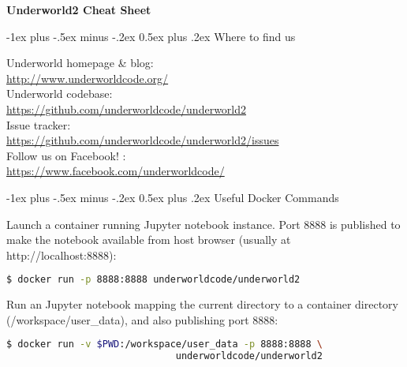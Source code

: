 \documentclass[10pt,landscape]{article}
\makeatletter
\renewcommand{\section}{\@startsection{section}{1}{0mm}%
                                {-1ex plus -.5ex minus -.2ex}%
                                {0.5ex plus .2ex}%
                                {\normalfont\large\bfseries}}
\makeatother
\begin{document}
\raggedright
\footnotesize

\begin{center}
     \Large{\textbf{Underworld2 Cheat Sheet}} \\
\end{center}
\begin{multicols}{2}
\setlength{\premulticols}{1pt}
\setlength{\postmulticols}{1pt}
\setlength{\multicolsep}{1pt}
\setlength{\columnsep}{2pt}

\section{Where to find us}

\setlength{\parindent}{16pt}

\noindent Underworld homepage \& blog: \\
\url{http://www.underworldcode.org/} \\

\noindent Underworld codebase: \\
\url{https://github.com/underworldcode/underworld2} \\

\noindent Issue tracker: \\
\url{https://github.com/underworldcode/underworld2/issues} \\
\noindent Follow us on Facebook! : \\
\url{https://www.facebook.com/underworldcode/}

\setlength{\parindent}{0pt}

\section{Useful Docker Commands}

\noindent Launch a container running Jupyter notebook instance. Port 8888 is
published to make the notebook available from host browser (usually at http://localhost:8888):
\begin{lstlisting}[language=bash]
$ docker run -p 8888:8888 underworldcode/underworld2
\end{lstlisting}

\noindent Run an Jupyter notebook mapping the current directory to a container directory (/workspace/user\_data), and
also publishing port 8888:
\begin{lstlisting}[language=bash]
$ docker run -v $PWD:/workspace/user_data -p 8888:8888 \
                              underworldcode/underworld2
\end{lstlisting}



\end{multicols}
\end{document}
